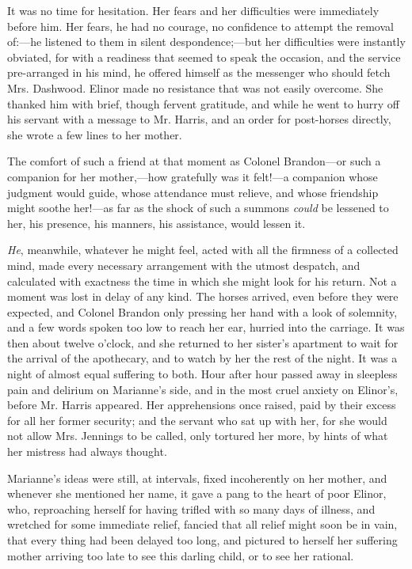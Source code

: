 It was no time for hesitation. Her fears and her difficulties were immediately before him. Her fears, he had no courage, no confidence to attempt the removal of:---he listened to them in silent despondence;---but her difficulties were instantly obviated, for with a readiness that seemed to speak the occasion, and the service pre-arranged in his mind, he offered himself as the messenger who should fetch Mrs. Dashwood. Elinor made no resistance that was not easily overcome. She thanked him with brief, though fervent gratitude, and while he went to hurry off his servant with a message to Mr. Harris, and an order for post-horses directly, she wrote a few lines to her mother.

The comfort of such a friend at that moment as Colonel Brandon---or such a companion for her mother,---how gratefully was it felt!---a companion whose judgment would guide, whose attendance must relieve, and whose friendship might soothe her!---as far as the shock of such a summons {\em could} be lessened to her, his presence, his manners, his assistance, would lessen it.

{\em He}, meanwhile, whatever he might feel, acted with all the firmness of a collected mind, made every necessary arrangement with the utmost despatch, and calculated with exactness the time in which she might look for his return. Not a moment was lost in delay of any kind. The horses arrived, even before they were expected, and Colonel Brandon only pressing her hand with a look of solemnity, and a few words spoken too low to reach her ear, hurried into the carriage. It was then about twelve o'clock, and she returned to her sister's apartment to wait for the arrival of the apothecary, and to watch by her the rest of the night. It was a night of almost equal suffering to both. Hour after hour passed away in sleepless pain and delirium on Marianne's side, and in the most cruel anxiety on Elinor's, before Mr. Harris appeared. Her apprehensions once raised, paid by their excess for all her former security; and the servant who sat up with her, for she would not allow Mrs. Jennings to be called, only tortured her more, by hints of what her mistress had always thought.

Marianne's ideas were still, at intervals, fixed incoherently on her mother, and whenever she mentioned her name, it gave a pang to the heart of poor Elinor, who, reproaching herself for having trifled with so many days of illness, and wretched for some immediate relief, fancied that all relief might soon be in vain, that every thing had been delayed too long, and pictured to herself her suffering mother arriving too late to see this darling child, or to see her rational.


